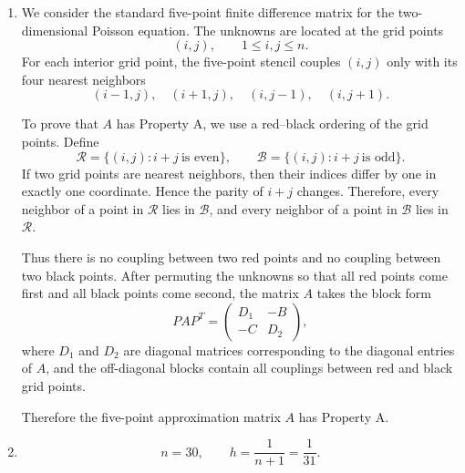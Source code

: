 \documentclass{ctexart}
\begin{document}
\begin{solution}
  \begin{enumerate}
    \item
      We consider the standard five-point finite difference matrix for the
      two-dimensional Poisson equation. The unknowns are located at the grid
      points
      \[
        (i,j),\qquad 1\leq i,j\leq n.
      \]
      For each interior grid point, the five-point stencil couples
      \((i,j)\) only with its four nearest neighbors
      \[
        (i-1,j),\quad (i+1,j),\quad (i,j-1),\quad (i,j+1).
      \]

      To prove that \(A\) has Property A, we use a red--black ordering of the
      grid points. Define
      \[
        \mathcal R=\{(i,j): i+j \ \text{is even}\},
        \qquad
        \mathcal B=\{(i,j): i+j \ \text{is odd}\}.
      \]
      If two grid points are nearest neighbors, then their indices differ by
      one in exactly one coordinate. Hence the parity of \(i+j\) changes.
      Therefore, every neighbor of a point in \(\mathcal R\) lies in
      \(\mathcal B\), and every neighbor of a point in \(\mathcal B\) lies in
      \(\mathcal R\).

      Thus there is no coupling between two red points and no coupling between
      two black points. After permuting the unknowns so that all red points
      come first and all black points come second, the matrix \(A\) takes the
      block form
      \[
        PAP^T
        =
        \begin{pmatrix}
          D_1 & -B \\
          -C & D_2
        \end{pmatrix},
      \]
      where \(D_1\) and \(D_2\) are diagonal matrices corresponding to the
      diagonal entries of \(A\), and the off-diagonal blocks contain all
      couplings between red and black grid points.


      Therefore the five-point approximation matrix \(A\) has Property A.
    \item \[
        n=30,\qquad h=\frac{1}{n+1}=\frac1{31}.
      \]


\end{enumerate}
\end{solution}
\end{document}
